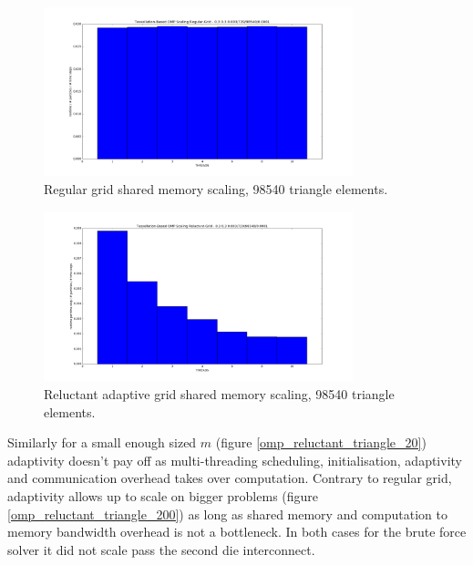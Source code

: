 \begin{figure}[htb]
  \begin{center}
    \includegraphics[width=0.8\textwidth]{experiments/omp/omp_mesh_regular_200.png}
  \end{center}
  \caption{Regular grid shared memory scaling, 98540 triangle elements.}
  \label{figure:omp_regular_bf_triangle_200}
\end{figure}

\begin{figure}[htb]
  \begin{center}
    \includegraphics[width=0.8\textwidth]{experiments/omp/omp_mesh_reluctant_200.png}
  \end{center}
  \caption{Reluctant adaptive grid shared memory scaling, 98540 triangle elements.}
  \label{figure:omp_reluctant_bf_triangle_200}
\end{figure}

Similarly for a small enough sized $m$ (figure \ref{omp_reluctant_triangle_20}) adaptivity doesn't pay off as multi-threading scheduling, initialisation, adaptivity and communication overhead takes over computation. Contrary to regular grid, adaptivity allows up to scale on bigger problems (figure \ref{omp_reluctant_triangle_200}) as long as shared memory and computation to memory bandwidth overhead is not a bottleneck. In both cases for the brute force solver it did not scale pass the second die interconnect.

